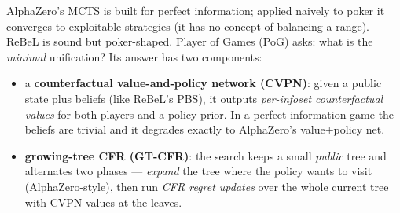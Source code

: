 \documentclass[11pt,a4paper]{article}
\begin{document}
AlphaZero's MCTS is built for perfect information; applied naively to poker it
converges to exploitable strategies (it has no concept of balancing a range).
ReBeL is sound but poker-shaped. Player of Games (PoG) asks: what is the
\emph{minimal} unification? Its answer has two components:

\begin{itemize}[leftmargin=1.4em, itemsep=2pt]
\item a \textbf{counterfactual value-and-policy network (CVPN)}: given a public
  state plus beliefs (like ReBeL's PBS), it outputs \emph{per-infoset
  counterfactual values} for both players and a policy prior. In a
  perfect-information game the beliefs are trivial and it degrades exactly to
  AlphaZero's value$+$policy net.
\item \textbf{growing-tree CFR (GT-CFR)}: the search keeps a small
  \emph{public} tree and alternates two phases --- \emph{expand} the tree where
  the policy wants to visit (AlphaZero-style), then run \emph{CFR regret
  updates} over the whole current tree with CVPN values at the leaves.
\end{itemize}
\end{document}
